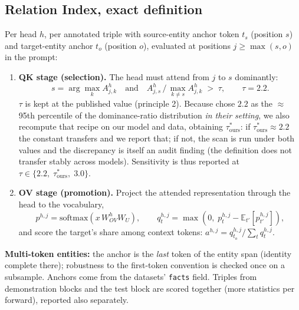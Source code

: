 \documentclass[11pt,a4paper]{article}
\begin{document}
\subsection{Relation Index, exact definition}
Per head $h$, per annotated triple with source-entity anchor token $t_s$ (position $s$) and target-entity anchor $t_o$ (position $o$), evaluated at positions $j \ge \max(s,o)$ in the prompt:
\begin{enumerate}[itemsep=1pt]
\item \textbf{QK stage (selection).} The head must attend from $j$ to $s$ dominantly:
\begin{equation}
s=\arg\max_k A^h_{j,k} \quad\text{and}\quad A^h_{j,s} \,\big/\, \max_{k\ne s} A^h_{j,k} \;>\; \tau, \qquad \tau = 2.2 .
\end{equation}
$\tau$ is kept at the published value (principle 2). Because \cite{ren} chose $2.2$ as the $\approx$95th percentile of the dominance-ratio distribution \emph{in their setting}, we also recompute that recipe on our model and data, obtaining $\tau^{*}_{\text{ours}}$: if $\tau^{*}_{\text{ours}} \approx 2.2$ the constant transfers and we report that; if not, the scan is run under both values and the discrepancy is itself an audit finding (the definition does not transfer stably across models). Sensitivity is thus reported at $\tau \in \{2.2,\; \tau^{*}_{\text{ours}},\; 3.0\}$.
\item \textbf{OV stage (promotion).} Project the attended representation through the head to the vocabulary,
\begin{equation}
p^{h,j} = \mathrm{softmax}\!\left(x\, W^h_{OV} W_U\right), \qquad
q^{h,j}_{t} = \max\!\left(0,\; p^{h,j}_{t} - \mathbb{E}_{t'}\!\left[p^{h,j}_{t'}\right]\right),
\end{equation}
and score the target's share among context tokens: $a^{h,j} = q^{h,j}_{t_o} \big/ \sum_{t} q^{h,j}_{t}$.
\end{enumerate}
\textbf{Multi-token entities:} the anchor is the \emph{last} token of the entity span (identity complete there); robustness to the first-token convention is checked once on a subsample. Anchors come from the datasets' \texttt{facts} field. Triples from demonstration blocks and the test block are scored together (more statistics per forward), reported also separately.
\end{document}
